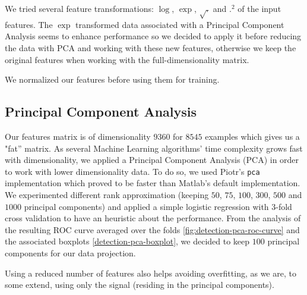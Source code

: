 \documentclass{article}
\begin{document}
  We tried several feature transformations: $\log$, $\exp$, $\sqrt{.}$ and $.^2$ of the input features. The $\exp$ transformed data associated with a Principal Component Analysis seems to enhance performance so we decided to apply it before reducing the data with PCA and working with these new features, otherwise we keep the original features when working with the full-dimensionality matrix.

  We normalized our features before using them for training.

  \subsection{Principal Component Analysis}
  Our features matrix is of dimensionality $9360$ for $8545$ examples which gives us a "fat'' matrix. As several Machine Learning algorithms' time complexity grows fast with dimensionality, we applied a Principal Component Analysis (PCA) in order to work with lower dimensionality data. To do so, we used Piotr's \texttt{pca} implementation which proved to be faster than Matlab's default implementation. We experimented different rank approximation (keeping $50$, $75$, $100$, $300$, $500$ and $1000$ principal components) and applied a simple logistic regression with 3-fold cross validation to have an heuristic about the performance. From the analysis of the resulting ROC curve averaged over the folds \ref{fig:detection-pca-roc-curve} and the associated boxplots \ref{detection-pca-boxplot}, we decided to keep $100$ principal components for our data projection.

  Using a reduced number of features also helps avoiding overfitting, as we are, to some extend, using only the signal (residing in the principal components).
\end{document}
